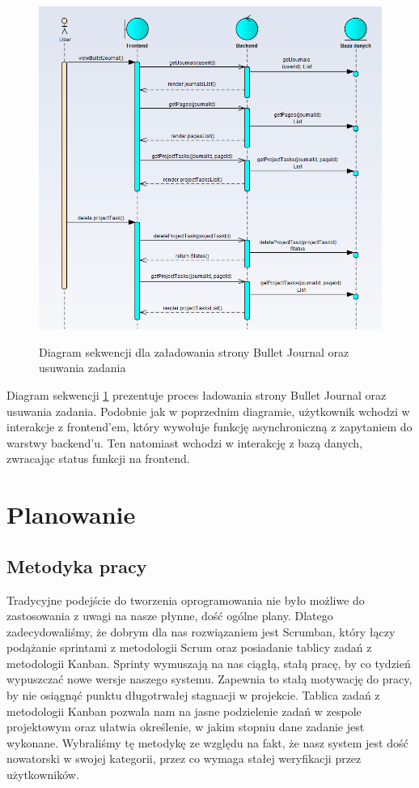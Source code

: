 \documentclass[a4paper,11pt]{report}
\begin{document}
\begin{figure}[H]
	\centering
	\includegraphics[scale=0.6]{sekwencji1}\\
	\caption{Diagram sekwencji dla załadowania strony Bullet Journal oraz usuwania zadania}
	\label{fig:seq2}
\end{figure}
Diagram sekwencji \ref{fig:seq2} prezentuje proces ładowania strony Bullet Journal oraz usuwania zadania.
Podobnie jak w poprzednim diagramie, użytkownik wchodzi w interakcje z frontend'em,
 który wywołuje funkcję asynchroniczną z zapytaniem do warstwy backend'u.
Ten natomiast wchodzi w interakcję z bazą danych, zwracając status funkcji na frontend.
\chapter {Planowanie}
\section{Metodyka pracy}
Tradycyjne podejście do tworzenia oprogramowania nie było możliwe do zastosowania z uwagi na nasze płynne, dość ogólne plany.
 Dlatego zadecydowaliśmy, że dobrym dla nas rozwiązaniem jest Scrumban, który łączy podążanie sprintami z metodologii Scrum
 oraz posiadanie tablicy zadań z metodologii Kanban\cite{agile}.
 Sprinty wymuszają na nas ciągłą, stałą pracę, by co tydzień wypuszczać nowe wersje naszego systemu.
 Zapewnia to stałą motywację do pracy, by nie osiągnąć punktu długotrwałej stagnacji w projekcie.
 Tablica zadań z metodologii Kanban pozwala nam na jasne podzielenie zadań w zespole projektowym
 oraz ułatwia określenie, w jakim stopniu dane zadanie jest wykonane.
 Wybraliśmy tę metodykę ze względu na fakt, że nasz system jest dość nowatorski w swojej kategorii,
 przez co wymaga stałej weryfikacji przez użytkowników.
 
\end{document}
